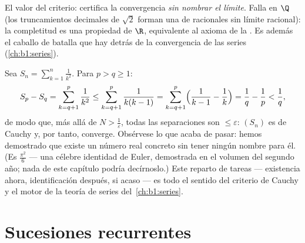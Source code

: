 \begin{remark}
El valor del criterio: certifica la convergencia \emph{sin nombrar el
límite}. Falla en $\Q$ (los truncamientos decimales de $\sqrt 2$ forman
una  de racionales sin límite racional): la
completitud es una propiedad de $\R$, equivalente al axioma de la
. Es además el caballo de batalla que hay detrás de la
convergencia de las series (\cref{ch:b1:series}).
\end{remark}

\begin{example}\label{ex:b1:seq:basel}
Sea $S_n = \sum_{k=1}^{n} \frac{1}{k^2}$. Para $p > q \geq 1$:
\[
S_p - S_q = \sum_{k=q+1}^{p} \frac{1}{k^2}
\leq \sum_{k=q+1}^{p} \frac{1}{k(k-1)}
= \sum_{k=q+1}^{p} \Bigl(\frac{1}{k-1} - \frac 1k\Bigr)
= \frac 1q - \frac 1p < \frac 1q ,
\]
de modo que, más allá de $N > \frac1\varepsilon$, todas las
separaciones son $\leq \varepsilon$: $(S_n)$ es de Cauchy y, por
tanto, converge. Obsérvese lo que acaba de pasar: hemos demostrado que
existe un número real concreto sin tener ningún nombre para él. (Es
$\frac{\pi^2}{6}$ --- una célebre identidad de Euler, demostrada en el
volumen del segundo año; nada de este capítulo podría decírnoslo.)
Este reparto de tareas --- existencia ahora, identificación después,
si acaso --- es todo el sentido del criterio de Cauchy y el motor de
la teoría de series del~\cref{ch:b1:series}.
\end{example}

\section{Sucesiones recurrentes}

